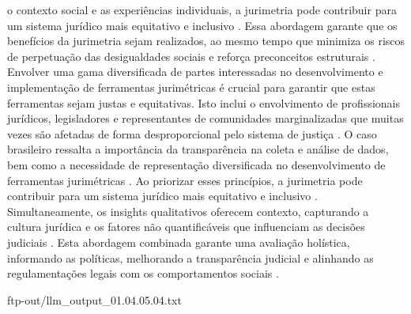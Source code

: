 \begin{agradecimentos}
o contexto social e as experiências individuais, a jurimetria pode contribuir para um sistema jurídico mais equitativo e inclusivo \cite{10.1590/dados.2022.65.3.267,10.1057/s41599-020-0396-5}. Essa abordagem garante que os benefícios da jurimetria sejam realizados, ao mesmo tempo que minimiza os riscos de perpetuação das desigualdades sociais e reforça preconceitos estruturais \cite{10.1590/dados.2022.65.3.267,10.1057/s41599-020-0396-5}. Envolver uma gama diversificada de partes interessadas no desenvolvimento e implementação de ferramentas jurimétricas é crucial para garantir que estas ferramentas sejam justas e equitativas. Isto inclui o envolvimento de profissionais jurídicos, legisladores e representantes de comunidades marginalizadas que muitas vezes são afetadas de forma desproporcional pelo sistema de justiça \cite{10.1007/s11186-021-09453-1,1023071190721}. O caso brasileiro ressalta a importância da transparência na coleta e análise de dados, bem como a necessidade de representação diversificada no desenvolvimento de ferramentas jurimétricas \cite{10.1590/dados.2022.65.3.267,10.1007/978-3-319-44000-215 }. Ao priorizar esses princípios, a jurimetria pode contribuir para um sistema jurídico mais equitativo e inclusivo \cite{ibeiro2021,restrepoamariles2015}. Simultaneamente, os insights qualitativos oferecem contexto, capturando a cultura jurídica e os fatores não quantificáveis que influenciam as decisões judiciais \cite{restrepoamariles2015,nunes2018}. Esta abordagem combinada garante uma avaliação holística, informando as políticas, melhorando a transparência judicial e alinhando as regulamentações legais com os comportamentos sociais \cite{massuanganhe2016,silva2023}. 
    
    ftp-out/llm_output_01.04.05.04.txt 
    
    
    

\end{agradecimentos}
